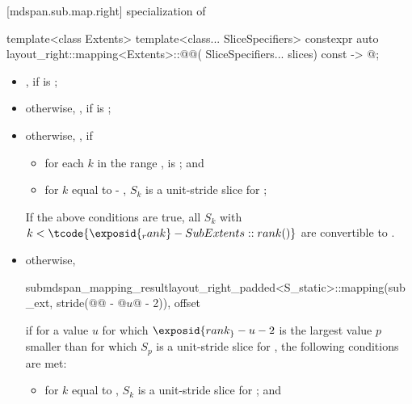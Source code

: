 [mdspan.sub.map.right]{ specialization of }

%
\begin{itemdecl}
template<class Extents>
template<class... SliceSpecifiers>
constexpr auto layout_right::mapping<Extents>::@@(
      SliceSpecifiers... slices) const -> @\seebelow@;
\end{itemdecl}

\begin{itemdescr}
\pnum
\returns
\begin{itemize}
\item
{},
if  is ;
\item
otherwise,
,
if  is ;
\item
otherwise,
,
if
  \begin{itemize}
  \item
  for each $k$ in the range ,
   is ; and
  \item
  for $k$ equal to  - ,
  $S_k$ is a unit-stride slice for ;
  \end{itemize}
\begin{note}
If the above conditions are true,
all $S_k$ with $k < \tcode{\exposid{_rank} - SubExtents::rank()}$
are convertible to .
\end{note}
\item
otherwise,
\begin{codeblock}
submdspan_mapping_result{layout_right_padded<S_static>::mapping(sub_ext,
                             stride(@@ - @$u$@ - 2)), offset}
\end{codeblock}
if for a value $u$ for which $\exposid{rank_} - u - 2$ is
the largest value $p$ smaller than 
for which $S_p$ is a unit-stride slice for ,
the following conditions are met:
\begin{itemize}
\item
for $k$ equal to ,
$S_k$ is a unit-stride slice for ; and

\end{itemize}
\end{itemize}
\end{itemdescr}

